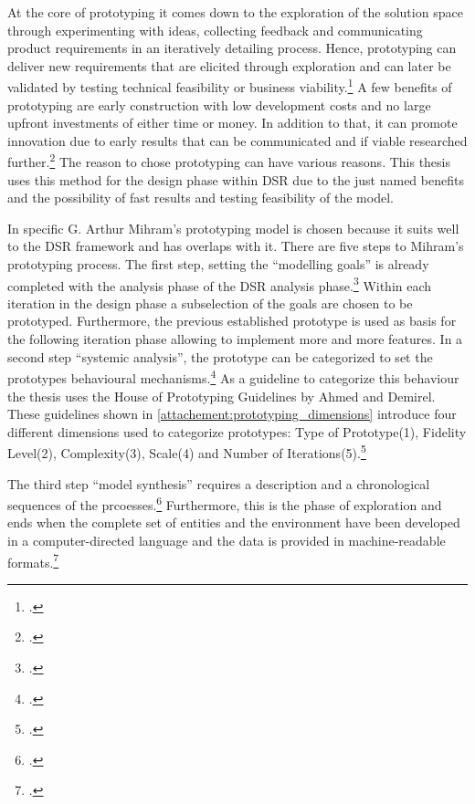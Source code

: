 At the core of prototyping it comes down to the exploration of the solution space through experimenting with ideas,
collecting feedback and
communicating product requirements in an iteratively detailing process.
Hence, prototyping can deliver new requirements that are elicited through exploration and can later be validated 
by testing technical feasibility or business viability.\footcite[cf.][8]{bjarnasonModelSoftwarePrototyping2021a}
A few benefits of prototyping are early construction with low development costs and no large upfront investments of either time or money.
In addition to that, it can promote innovation due to early results that can be communicated and if viable researched further.\footcite[cf.][25]{nelsonSoftwarePrototyping2016}
The reason to chose prototyping can have various reasons. 
This thesis uses this method for the design phase within \ac{DSR} due to the just named benefits and the possibility of fast results and testing feasibility of the model.

In specific G. Arthur Mihram's prototyping model is chosen because it suits well to the \ac{DSR} framework and has overlaps with it. 
There are five steps to Mihram's prototyping process.
The first step, setting the ``modelling goals'' is already completed with the analysis phase of the \ac{DSR} analysis phase.\footcite[cf.][71]{mihramSimulationMethodology1976}
Within each iteration in the design phase a subselection of the goals are chosen to be prototyped. 
Furthermore, the previous established prototype is used as basis for the following iteration phase allowing to implement more and more features.
In a second step ``systemic analysis'', the prototype can be categorized to set the prototypes behavioural mechanisms.\footcite[cf.][71-72]{mihramSimulationMethodology1976}
As a guideline to categorize this behaviour the thesis uses the House of Prototyping Guidelines by Ahmed and Demirel.
These guidelines shown in \ref{attachement:prototyping_dimensions} introduce four different dimensions used to categorize prototypes:
Type of Prototype(1), Fidelity Level(2), Complexity(3), Scale(4) and Number of Iterations(5).\footcite[cf.][6-7]{ahmedPrototypingFrameworkHumanCentered2021}

The third step ``model synthesis'' requires a description and a chronological sequences of the prcoesses.\footcite[cf.][71-72]{mihramSimulationMethodology1976}
Furthermore, this is the phase of exploration and ends when the complete set of entities and the environment have been developed in a computer-directed language and the data is provided in machine-readable formats.\footcite[cf.][75-76]{mihramSimulationMethodology1976}

